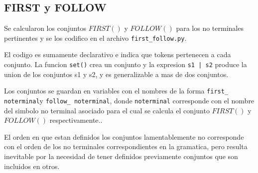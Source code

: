 \documentclass [a4paper,titlepage]{report}
\begin{document}
\subsection{FIRST y FOLLOW}

Se calcularon los conjuntos $FIRST()$ y $FOLLOW()$ para los no terminales
pertinentes y se los codifico en el archivo \texttt{first\_follow.py}.

El codigo es sumamente declarativo e indica que tokens pertenecen a cada conjunto.
La funcion \texttt{set()} crea un conjunto y la expresion \texttt{s1 | s2} produce
la union de los conjuntos s1 y s2, y es generalizable a mas de dos conjuntos.

Los conjuntos se guardan en variables con el nombres de la forma
\texttt{first\_ noterminal}y \texttt{follow\_ noterminal}, donde
\texttt{noterminal} corresponde con el nombre del simbolo no terminal asociado
para el cual se calcula el conjunto $FIRST()$ y $FOLLOW()$ respectivamente..

El orden en que estan definidos los conjuntos lamentablemente no corresponde
con el orden de los no terminales correspondientes en la gramatica, pero
resulta inevitable por la necesidad de tener definidos previamente conjuntos
que son incluidos en otros.
\end{document}
